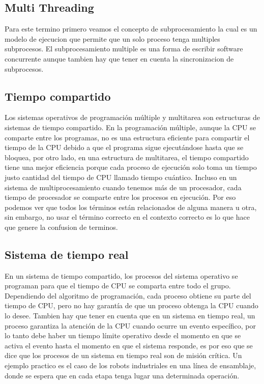 \documentclass[conference,letterpaper]{IEEEtran}
\begin{document}
\subsection{Multi Threading}
Para este termino primero veamos el concepto de subprocesamiento la cual es un modelo de ejecucion que permite que un solo proceso tenga multiples subprocesos. El subprocesamiento multiple es una forma de escribir software concurrente aunque tambien hay que tener en cuenta la sincronizacion de subprocesos.

\subsection{Tiempo compartido}
Los sistemas operativos de programación múltiple y multitarea son estructuras de sistemas de tiempo compartido. En la programación múltiple, aunque la CPU se comparte entre los programas, no es una estructura eficiente para compartir el tiempo de la CPU debido a que el programa sigue ejecutándose hasta que se bloquea, por otro lado, en una estructura de multitarea, el tiempo compartido tiene una mejor eficiencia porque cada proceso de ejecución solo toma un tiempo justo cantidad del tiempo de CPU llamado tiempo cuántico. Incluso en un sistema de multiprocesamiento cuando tenemos más de un procesador, cada tiempo de procesador se comparte entre los procesos en ejecución. Por eso podemos ver que todos los términos están relacionados de alguna manera u otra, sin embargo, no usar el término correcto en el contexto correcto es lo que hace que genere la confusion de terminos. 

\subsection{Sistema de tiempo real}
 En un sistema de tiempo compartido, los procesos del sistema operativo se programan para que el tiempo de CPU se comparta entre todo el grupo. Dependiendo del algoritmo de programación, cada proceso obtiene su parte del tiempo de CPU, pero no hay garantía de que un proceso obtenga la CPU cuando lo desee. Tambien hay que tener en cuenta que en un sistema en tiempo real, un proceso garantiza la atención de la CPU cuando ocurre un evento específico, por lo tanto debe haber un tiempo límite operativo desde el momento en que se activa el evento hasta el momento en que el sistema responde, es por eso que se dice que los procesos de un sistema en tiempo real son de misión crítica. Un ejemplo practico es el caso de los robots industriales en una línea de ensamblaje, donde se espera que en cada etapa tenga lugar una determinada operación.\\
 
\end{document}
